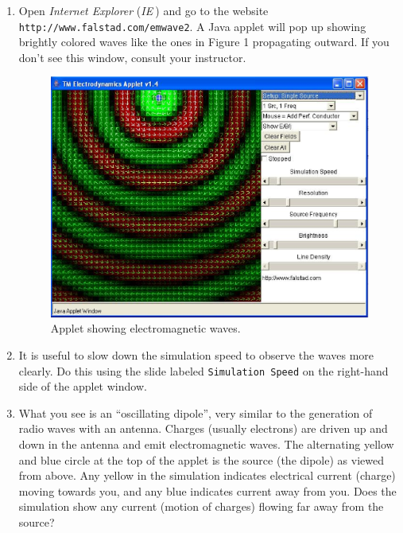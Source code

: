 \begin{enumerate}

\item Open {\it Internet Explorer} ({\it IE$~$}) and go to the website
{\tt \verb!http://www.falstad.com/emwave2!}. A Java applet will pop up showing
brightly colored waves like the ones in Figure 1 propagating outward. 
If you don't see this window, consult your instructor.
\begin{figure}[hbt]
\begin{center}
\includegraphics[width=6.0in]{plane_waves/emwaves1.eps}
\caption{Applet showing electromagnetic waves.}
\end{center}
\end{figure}

\item It is useful to slow down the simulation speed to observe the waves more clearly.
Do this using the slide labeled
{\tt Simulation Speed} on the right-hand side of the applet window.

\item What you see is an ``oscillating dipole'', very similar to the generation of radio waves with an antenna.
Charges (usually electrons) are driven up and down in the antenna and emit electromagnetic 
waves.  
The alternating yellow and blue circle at the top of the applet is the source (the dipole)
as viewed from above.  Any yellow in the simulation indicates electrical current (charge) moving towards you, and any blue indicates current away from you.  Does the simulation show any current (motion of charges) flowing far away from the source?
\vspace{1.5cm}


\end{enumerate}
